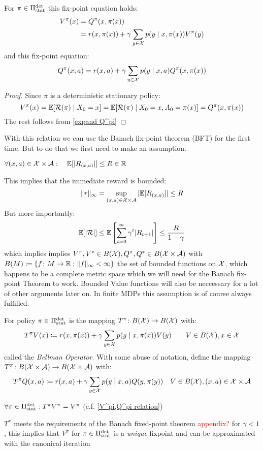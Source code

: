\begin{corollary}\label{V^pi,Q^pi relation} For \(\pi\in\Pi_{\textnormal{stat}}^{\textnormal{det}}\) this fix-point equation holds: 
\begin{align*}
	V^\pi(x)&=Q^\pi(x,\pi(x))\\
	 &=r(x,\pi(x))+\gamma\sum\limits_{y\in\mathcal{X}}p(y\mid x,\pi(x))V^\pi(y)
\end{align*}
and this fix-point equation:
\[
	Q^\pi(x,a)=r(x,a)+\gamma\sum_{y\in\mathcal{X}}p(y\mid x,a)Q^\pi(x,\pi(x))
\]
\end{corollary}

\begin{proof}
Since \(\pi\) is a deterministic stationary policy:
\[V^\pi(x)=\mathbb{E}[\mathcal{R}(\pi)\mid X_0=x]=\mathbb{E}[\mathcal{R}(\pi)\mid X_0=x, A_0=\pi(x)]=Q^\pi(x,\pi(x))\]
The rest follows from \ref{expand Q^pi}
\end{proof}

With this relation we can use the Banach fix-point theorem (BFT) for the first time. But to do that we first need to make an assumption.
\begin{assumption} 
	\(\forall (x,a)\in\mathcal{X}\times\mathcal{A}:\quad\mathbb{E}[|R_{(x,a)}|]\le R\in\mathbb{R}\)
\end{assumption}
This implies that the immediate reward is bounded:
\[
	\|r\|_{\infty}=\sup_{(x,a)\in\mathcal{X}\times\mathcal{A}}|\mathbb{E}[R_{(x,a)}]|\le R
\]
But more importantly:
\[
	\mathbb{E}[|\mathcal{R}|]\le\mathbb{E}\left[\sum_{t=0}^\infty \gamma^t |R_{t+1}|\right]
	\le \frac{R}{1-\gamma} 
\]
which implies implies \(V^\pi,V^* \in B(\mathcal{X}), Q^\pi,Q^* \in B(\mathcal{X}\times\mathcal{A})\) with \(B(M)\coloneqq \{f\colon M\to\mathbb{R} : \|f\|_\infty <\infty \} \) the set of bounded functions on \(\mathcal{X}\), which happens to be a complete metric space which we will need for the Banach fix-point Theorem to work. Bounded Value functions will also be neccessary for a lot of other arguments later on. In finite MDPs this assumption is of course always fulfilled. 


\begin{definition} For policy \(\pi\in\Pi_{\textnormal{stat}}^{\textnormal{det}}\) is the mapping \(T^\pi\colon B(\mathcal{X})\to B(\mathcal{X})\) with:
	\[
	T^\pi V(x)\coloneqq r(x,\pi(x))+\gamma\sum_{y\in\mathcal{X}}p(y\mid x,\pi(x)) V(y)\qquad V\in B(\mathcal{X}), x\in\mathcal{X}
	\]
called the \emph{Bellman Operator}. With some abuse of notation, define the mapping \(T^\pi\colon B(\mathcal{X}\times\mathcal{A})\to B(\mathcal{X}\times\mathcal{A})\) with:
	\[
	T^\pi Q(x,a)\coloneqq r(x,a)+\gamma\sum_{y\in\mathcal{X}}p(y\mid x,a) Q(y,\pi(y))\quad V\in B(\mathcal{X}), (x,a)\in\mathcal{X}\times\mathcal{A} 
	\]
\end{definition}


\begin{remark}
	\(\forall\pi\in\Pi_{\textnormal{stat}}^{\textnormal{det}} : T^\pi V^\pi=V^\pi\) (c.f. \ref{V^pi,Q^pi relation})

	\(T^\pi\) meets the requirements of the Banach fixed-point theorem \textcolor{red}{appendix?} for \({\gamma<1}\), this implies that \(V^\pi\) for \(\pi\in\Pi_{\textnormal{stat}}^{\textnormal{det}}\)
	is a \emph{unique} fixpoint and can be approximated with the canonical iteration
\end{remark}

